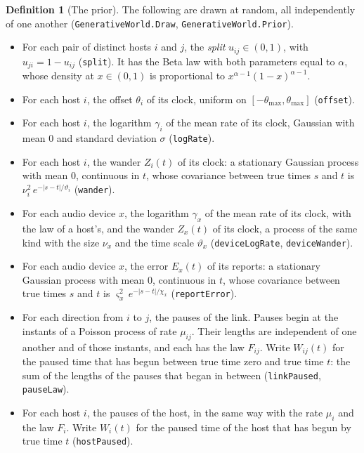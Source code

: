 \documentclass[11pt,a4paper]{article}
\newcommand{\lean}[1]{\texttt{#1}}
\theoremstyle{definition}
\newtheorem{definition}{Definition}[section]
\begin{document}
\begin{definition}[The prior]
The following are drawn at random, all independently of one another
(\lean{GenerativeWorld.\allowbreak Draw},
\lean{GenerativeWorld.\allowbreak Prior}).
\begin{itemize}
\item For each pair of distinct hosts $i$ and $j$, the \emph{split}
  $u_{ij} \in (0, 1)$, with $u_{ji} = 1 - u_{ij}$ (\lean{split}). It has the
  Beta law with both parameters equal to $\alpha$, whose density at
  $x \in (0, 1)$ is proportional to $x^{\alpha - 1}(1 - x)^{\alpha - 1}$.
\item For each host $i$, the offset $\theta_i$ of its clock, uniform on
  $[-\theta_{\max}, \theta_{\max}]$ (\lean{offset}).
\item For each host $i$, the logarithm $\gamma_i$ of the mean rate of its
  clock, Gaussian with mean $0$ and standard deviation $\sigma$
  (\lean{logRate}).
\item For each host $i$, the wander $Z_i(t)$ of its clock: a stationary
  Gaussian process with mean $0$, continuous in $t$, whose covariance
  between true times $s$ and $t$ is $\nu_i^2\,e^{-|s - t|/\vartheta_i}$
  (\lean{wander}).
\item For each audio device $x$, the logarithm $\gamma_x$ of the mean rate
  of its clock, with the law of a host's, and the wander $Z_x(t)$ of its
  clock, a process of the same kind with the size $\nu_x$ and the time
  scale $\vartheta_x$ (\lean{deviceLogRate}, \lean{deviceWander}).
\item For each audio device $x$, the error $E_x(t)$ of its reports: a
  stationary Gaussian process with mean $0$, continuous in $t$, whose
  covariance between true times $s$ and $t$ is
  $\varsigma_x^2\,e^{-|s - t|/\chi_x}$ (\lean{reportError}).
\item For each direction from $i$ to $j$, the pauses of the link. Pauses
  begin at the instants of a Poisson process of rate $\mu_{ij}$. Their
  lengths are independent of one another and of those instants, and each
  has the law $F_{ij}$. Write $W_{ij}(t)$ for the paused time that has
  begun between true time zero and true time $t$: the sum of the lengths of
  the pauses that began in between (\lean{linkPaused}, \lean{pauseLaw}).
\item For each host $i$, the pauses of the host, in the same way with the
  rate $\mu_i$ and the law $F_i$. Write $W_i(t)$ for the paused time of
  the host that has begun by true time $t$ (\lean{hostPaused}).
\end{itemize}
\end{definition}
\end{document}
